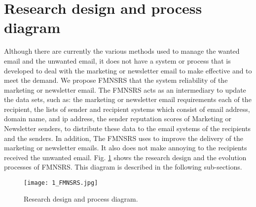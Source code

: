 \documentclass[conference]{IEEEtran}
\begin{document}
\section{Research design and process diagram}
Although there are currently the various methods used to manage the wanted email and the unwanted email, it does not have a system or process that is developed to deal with the marketing or newsletter email to make effective and to meet the demand.
%
We propose FMNSRS that the system reliability of the marketing or newsletter email.
The FMNSRS acts as an intermediary to update the data sets, such as: 
the marketing or newsletter email requirements each of the recipient, 
the lists of sender and recipient systems which consist of email address, domain name, and ip address, 
the sender reputation scores of Marketing or Newsletter senders, 
to distribute these data to the email systems of the recipients and the senders.
In addition, The FMNSRS uses to improve the delivery of the marketing or newsletter emails. 
It also does not make annoying to the recipients received the unwanted email.
Fig. \ref{fig:FMNRS} shows the research design and the evolution processes of FMNSRS. 
This diagram is described in the following sub-sections.

\begin{figure}
\centering
\texttt{[image: 1\_FMNSRS.jpg]}
\caption{Research design and process diagram.}
\label{fig:FMNRS}
\end{figure}

\end{document}
